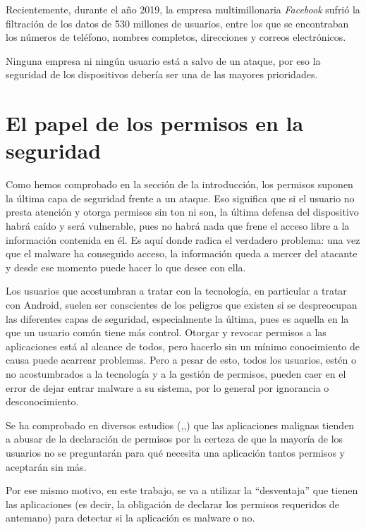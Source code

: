Recientemente, durante el año 2019, la empresa multimillonaria \textit{Facebook} sufrió la filtración de los datos de 530 millones de usuarios, entre los que se encontraban los números de teléfono, nombres completos, direcciones y correos electrónicos.

Ninguna empresa ni ningún usuario está a salvo de un ataque, por eso la seguridad de los dispositivos debería ser una de las mayores prioridades.

\section{El papel de los permisos en la seguridad}

Como hemos comprobado en la sección \textit{\underline{}} de la introducción, los permisos suponen la última capa de seguridad frente a un ataque. Eso significa que si el usuario no presta atención y otorga permisos sin ton ni son, la última defensa del dispositivo habrá caído y será vulnerable, pues no habrá nada que frene el acceso libre a la información contenida en él. Es aquí donde radica el verdadero problema: una vez que el malware ha conseguido acceso, la información queda a mercer del atacante y desde ese momento puede hacer lo que desee con ella.

Los usuarios que acostumbran a tratar con la tecnología, en particular a tratar con Android, suelen ser conscientes de los peligros que existen si se despreocupan las diferentes capas de seguridad, especialmente la última, pues es aquella en la que un usuario común tiene más control. Otorgar y revocar permisos a las aplicaciones está al alcance de todos, pero hacerlo sin un mínimo conocimiento de causa puede acarrear problemas. Pero a pesar de esto, todos los usuarios, estén o no acostumbrados a la tecnología y a la gestión de permisos, pueden caer en el error de dejar entrar malware a su sistema, por lo general por ignorancia o desconocimiento. %

Se ha comprobado en diversos estudios (\hypersetup{citecolor=red}\cite{attandck},\hypersetup{citecolor=red}\cite{giang},\hypersetup{citecolor=red}\cite{bassole}) que las aplicaciones malignas tienden a abusar de la declaración de permisos por la certeza de que la mayoría de los usuarios no se preguntarán para qué necesita una aplicación tantos permisos y aceptarán sin más. %

Por ese mismo motivo, en este trabajo, se va a utilizar la ``desventaja'' que tienen las aplicaciones (es decir, la obligación de declarar los permisos requeridos de antemano) para detectar si la aplicación es malware o no.
\fi %
